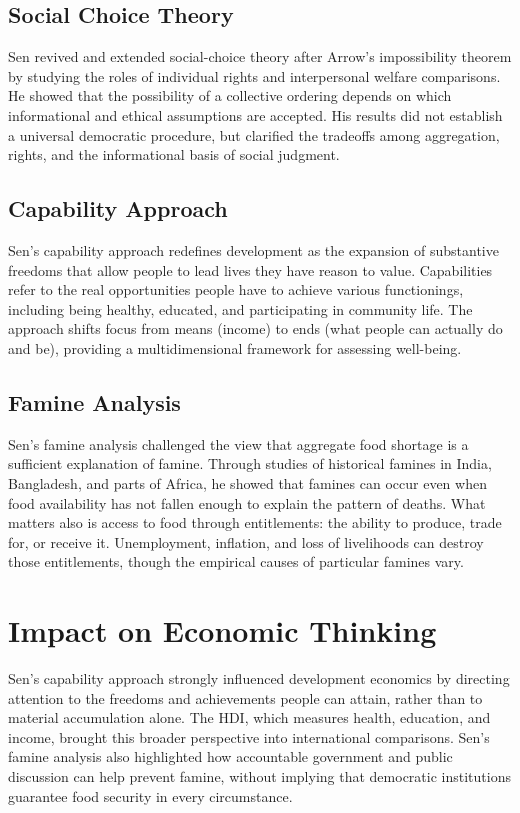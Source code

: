 \subsection*{Social Choice Theory}
Sen revived and extended social-choice theory after Arrow's impossibility theorem
by studying the roles of individual rights and interpersonal welfare comparisons.
He showed that the possibility of a collective ordering depends on which
informational and ethical assumptions are accepted. His results did not establish
a universal democratic procedure, but clarified the tradeoffs among aggregation,
rights, and the informational basis of social judgment.

\subsection*{Capability Approach}
Sen's capability approach redefines development as the expansion of substantive
freedoms that allow people to lead lives they have reason to value. Capabilities
refer to the real opportunities people have to achieve various functionings,
including being healthy, educated, and participating in community life. The
approach shifts focus from means (income) to ends (what people can actually do
and be), providing a multidimensional framework for assessing well-being.

\subsection*{Famine Analysis}
Sen's famine analysis challenged the view that aggregate food shortage is a
sufficient explanation of famine. Through studies of historical famines in India,
Bangladesh, and parts of Africa, he showed that famines can occur even when food
availability has not fallen enough to explain the pattern of deaths. What matters
also is access to food through entitlements: the ability to produce, trade for, or
receive it. Unemployment, inflation, and loss of livelihoods can destroy those
entitlements, though the empirical causes of particular famines vary.

\section{Impact on Economic Thinking}
Sen's capability approach strongly influenced development economics by directing
attention to the freedoms and achievements people can attain, rather than to
material accumulation alone. The HDI, which measures health, education, and
income, brought this broader perspective into international comparisons. Sen's
famine analysis also highlighted how accountable government and public discussion
can help prevent famine, without implying that democratic institutions guarantee
food security in every circumstance.

